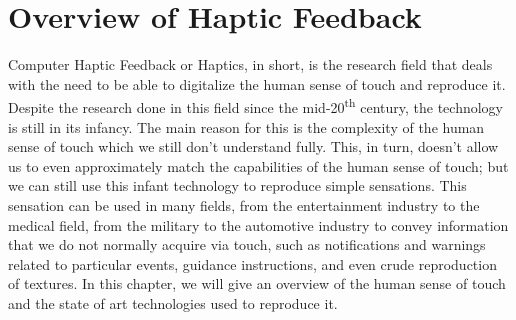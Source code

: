 
\chapter{Overview of Haptic Feedback} %

\label{Chapter3}

Computer Haptic Feedback or Haptics, in short, is the research field that deals with the need to be able to digitalize the human sense of touch and reproduce it. Despite the research done in this field since the mid-20\textsuperscript{th} century, the technology is still in its infancy. The main reason for this is the complexity of the human sense of touch which we still don't understand fully.
This, in turn, doesn't allow us to even approximately match the capabilities of the human sense of touch; but we can still use this infant technology to reproduce simple sensations.
This sensation can be used in many fields, from the entertainment industry to the medical field, from the military to the automotive industry to convey information that we do not normally acquire via touch, such as notifications
and warnings related to particular events, guidance instructions, and even crude reproduction of textures.
In this chapter, we will give an overview of the human sense of touch and the state of art technologies used to reproduce it.





